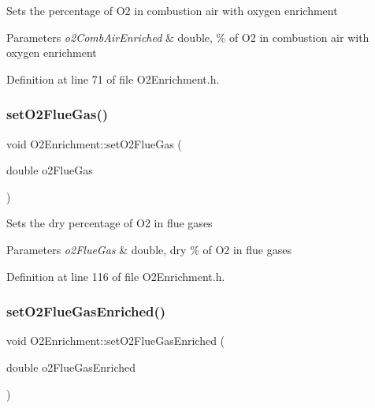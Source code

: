 Sets the percentage of O2 in combustion air with oxygen enrichment 
\begin{DoxyParams}{Parameters}
{\em o2\+Comb\+Air\+Enriched} & double, \% of O2 in combustion air with oxygen enrichment \\
\hline
\end{DoxyParams}


Definition at line 71 of file O2\+Enrichment.\+h.

\mbox{\label{class_o2_enrichment_aef67aa13531717c0d1832921ce6d27ae}} 
\subsubsection{\texorpdfstring{set\+O2\+Flue\+Gas()}{setO2FlueGas()}}
{\footnotesize\ttfamily void O2\+Enrichment\+::set\+O2\+Flue\+Gas (\begin{DoxyParamCaption}\item[{double}]{o2\+Flue\+Gas }\end{DoxyParamCaption})\hspace{0.3cm}{\ttfamily [inline]}}

Sets the dry percentage of O2 in flue gases 
\begin{DoxyParams}{Parameters}
{\em o2\+Flue\+Gas} & double, dry \% of O2 in flue gases \\
\hline
\end{DoxyParams}


Definition at line 116 of file O2\+Enrichment.\+h.

\mbox{\label{class_o2_enrichment_a9866f25fe54e561579079ee1a3889c2d}} 
\subsubsection{\texorpdfstring{set\+O2\+Flue\+Gas\+Enriched()}{setO2FlueGasEnriched()}}
{\footnotesize\ttfamily void O2\+Enrichment\+::set\+O2\+Flue\+Gas\+Enriched (\begin{DoxyParamCaption}\item[{double}]{o2\+Flue\+Gas\+Enriched }\end{DoxyParamCaption})\hspace{0.3cm}{\ttfamily [inline]}}

